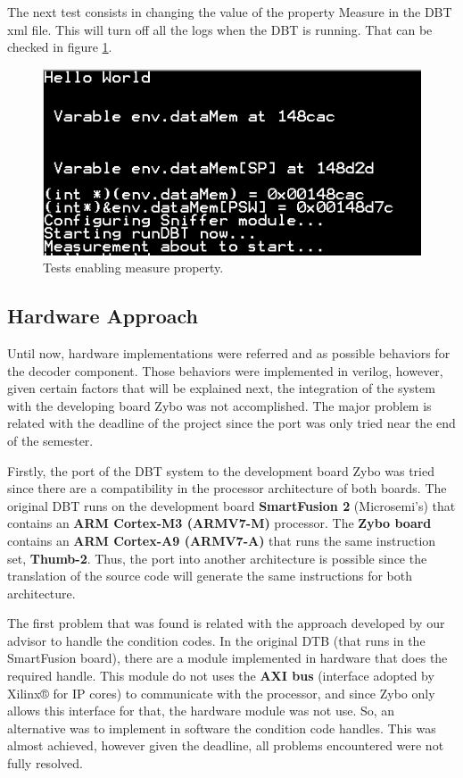 The next test consists in changing the value of the property Measure in the DBT xml file. This will turn off all the logs when the DBT is running. That can be checked in figure \ref{fig:val4}.

\begin{figure}[H]
\centerline{
\includegraphics[scale=0.6]{images/val4}
}
\caption{Tests enabling measure property.}
\label{fig:val4}
\end{figure}


\newpage
\subsection{Hardware Approach}

Until now, hardware implementations were referred and as possible behaviors for the decoder component. Those behaviors were implemented in verilog, however, given certain factors that will be explained next, the integration of the system with the developing board Zybo was not accomplished. The major problem is related with the deadline of the project since the port was only tried near the end of the semester.

Firstly, the port of the DBT system to the development board Zybo was tried since there are a compatibility in the processor architecture of both boards. The original DBT runs on the development board \textbf{SmartFusion 2} (Microsemi's) that contains an \textbf{ARM Cortex-M3 (ARMV7-M)} processor. The \textbf{Zybo board} contains an \textbf{ARM Cortex-A9 (ARMV7-A)} that runs the same instruction set, \textbf{Thumb-2}. Thus, the port into another architecture is possible since the translation of the source code will generate the same instructions for both architecture. 

The first problem that was found is related with the approach developed by our advisor to handle the condition codes. In the original DTB (that runs in the SmartFusion board), there are a module implemented in hardware that does the required handle. This module do not uses the \textbf{AXI bus} (interface adopted by Xilinx® for IP cores) to communicate with the processor, and since Zybo only allows this interface for that, the hardware module was not use. So, an alternative was to implement in software the condition code handles. This was almost achieved, however given the deadline, all problems encountered were not fully resolved.

